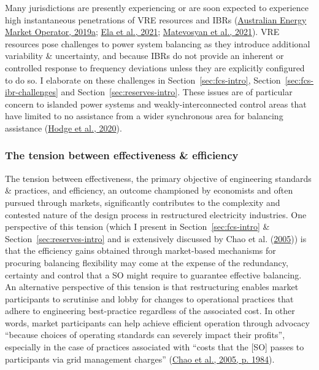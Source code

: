 \documentclass[12pt,a4paper,]{report}
\begin{document}
Many jurisdictions are presently experiencing or are soon expected to
experience high instantaneous penetrations of VRE resources and IBRs
(\protect\hyperlink{ref-australianenergymarketoperatorMaintainingPowerSystem2019}{Australian
Energy Market Operator, 2019a};
\protect\hyperlink{ref-elaElectricityMarketFuture2021}{Ela et al.,
2021};
\protect\hyperlink{ref-matevosyanFutureInverterBasedResources2021}{Matevosyan
et al., 2021}). VRE resources pose challenges to power system balancing
as they introduce additional variability \& uncertainty, and because
IBRs do not provide an inherent or controlled response to frequency
deviations unless they are explicitly configured to do so. I elaborate
on these challenges in Section~\ref{sec:fcs-intro},
Section~\ref{sec:fcs-ibr-challenges} and
Section~\ref{sec:reserves-intro}. These issues are of particular concern
to islanded power systems and weakly-interconnected control areas that
have limited to no assistance from a wider synchronous area for
balancing assistance
(\protect\hyperlink{ref-hodgeAddressingTechnicalChallenges2020}{Hodge et
al., 2020}).

\hypertarget{the-tension-between-effectiveness-efficiency}{%
\subsubsection{The tension between effectiveness \&
efficiency}\label{the-tension-between-effectiveness-efficiency}}

The tension between effectiveness, the primary objective of engineering
standards \& practices, and efficiency, an outcome championed by
economists and often pursued through markets, significantly contributes
to the complexity and contested nature of the design process in
restructured electricity industries. One perspective of this tension
(which I present in Section~\ref{sec:fcs-intro} \&
Section~\ref{sec:reserves-intro} and is extensively discussed by Chao et
al. (\protect\hyperlink{ref-chaoInterfaceEngineeringMarket2005}{2005}))
is that the efficiency gains obtained through market-based mechanisms
for procuring balancing flexibility may come at the expense of the
redundancy, certainty and control that a SO might require to guarantee
effective balancing. An alternative perspective of this tension is that
restructuring enables market participants to scrutinise and lobby for
changes to operational practices that adhere to engineering
best-practice regardless of the associated cost. In other words, market
participants can help achieve efficient operation through advocacy
``because choices of operating standards can severely impact their
profits'', especially in the case of practices associated with ``costs
that the {[}SO{]} passes to participants via grid management charges''
(\protect\hyperlink{ref-chaoInterfaceEngineeringMarket2005}{Chao et al.,
2005, p. 1984}).
\end{document}
